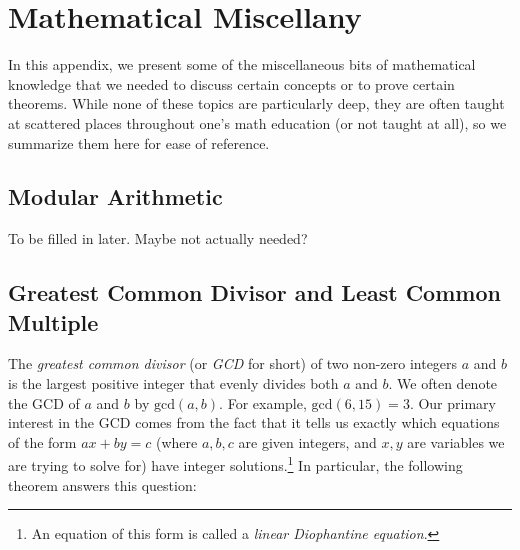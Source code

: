 
\renewcommand{\chapterfolder}{appendices/}

\chapter{Mathematical Miscellany}\label{app:math}

In this appendix, we present some of the miscellaneous bits of mathematical knowledge that we needed to discuss certain concepts or to prove certain theorems. While none of these topics are particularly deep, they are often taught at scattered places throughout one's math education (or not taught at all), so we summarize them here for ease of reference.


\section{Modular Arithmetic}\label{sec:modular_arithmetic}

To be filled in later. Maybe not actually needed?


\section{Greatest Common Divisor and Least Common Multiple}\label{sec:gcd}

The \emph{greatest common divisor} (or \emph{GCD} for short) of two non-zero integers $a$ and $b$ is the largest positive integer that evenly divides both $a$ and $b$. We often denote the GCD of $a$ and $b$ by $\mathrm{gcd}(a,b)$. For example, $\mathrm{gcd}(6,15) = 3$. Our primary interest in the GCD comes from the fact that it tells us exactly which equations of the form $ax + by = c$ (where $a,b,c$ are given integers, and $x,y$ are variables we are trying to solve for) have integer solutions.\footnote{An equation of this form is called a \emph{linear Diophantine equation}.} In particular, the following theorem answers this question:

